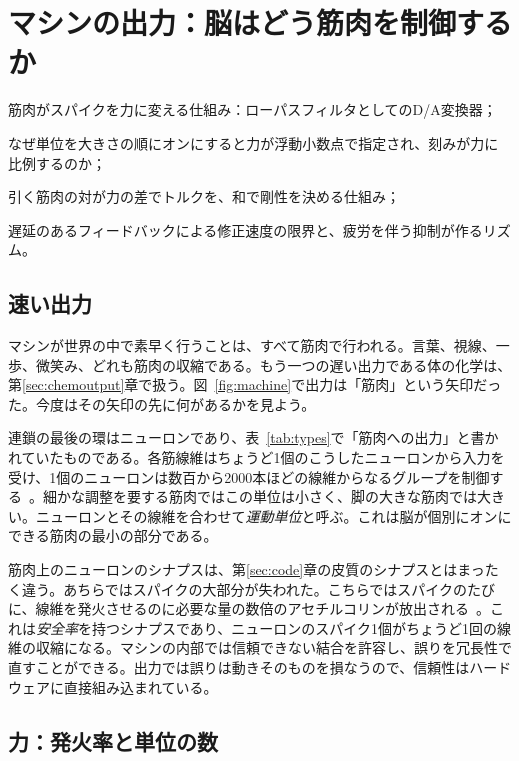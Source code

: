 \chapter{マシンの出力：脳はどう筋肉を制御するか}
\label{sec:muscles}
\begin{chaptergoals}
\item 筋肉がスパイクを力に変える仕組み：ローパスフィルタとしてのD/A変換器；
\item なぜ単位を大きさの順にオンにすると力が浮動小数点で指定され、刻みが力に比例するのか；
\item 引く筋肉の対が力の差でトルクを、和で剛性を決める仕組み；
\item 遅延のあるフィードバックによる修正速度の限界と、疲労を伴う抑制が作るリズム。
\end{chaptergoals}

\section{速い出力}

マシンが世界の中で素早く行うことは、すべて筋肉で行われる。言葉、視線、一歩、微笑み、どれも筋肉の収縮である。もう一つの遅い出力である体の化学は、第\ref{sec:chemoutput}章で扱う。図~\ref{fig:machine}で出力は「筋肉」という矢印だった。今度はその矢印の先に何があるかを見よう。

連鎖の最後の環はニューロンであり、表~\ref{tab:types}で「筋肉への出力」と書かれていたものである。各筋線維はちょうど1個のこうしたニューロンから入力を受け、1個のニューロンは数百から2000本ほどの線維からなるグループを制御する~\cite{Feinstein1955mu}。細かな調整を要する筋肉ではこの単位は小さく、脚の大きな筋肉では大きい。ニューロンとその線維を合わせて\emph{運動単位}と呼ぶ。これは脳が個別にオンにできる筋肉の最小の部分である。

筋肉上のニューロンのシナプスは、第\ref{sec:code}章の皮質のシナプスとはまったく違う。あちらではスパイクの大部分が失われた。こちらではスパイクのたびに、線維を発火させるのに必要な量の数倍のアセチルコリンが放出される~\cite{WoodSlater2001}。これは\emph{安全率}を持つシナプスであり、ニューロンのスパイク1個がちょうど1回の線維の収縮になる。マシンの内部では信頼できない結合を許容し、誤りを冗長性で直すことができる。出力では誤りは動きそのものを損なうので、信頼性はハードウェアに直接組み込まれている。

\section{力：発火率と単位の数}

